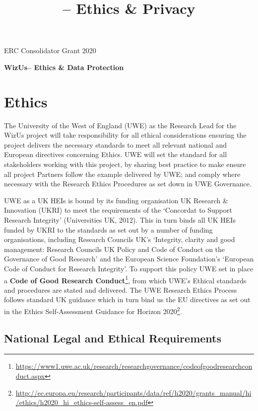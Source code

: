\documentclass[11pt,a4paper]{report}
\title{\project -- Ethics \& Privacy}
\newcommand{\project}{WizUs\xspace}
\begin{document}
\begin{center}
    ERC Consolidator Grant 2020

    \vspace{2cm}

    \textbf{\LARGE \project -- Ethics \& Data Protection}

    \vspace{2cm}

\end{center}

\section{Ethics}

The University of the West of England (UWE) as the Research Lead for the
\project project will take responsibility for all ethical considerations
ensuring the project delivers the necessary standards to meet all relevant
national and European directives concerning Ethics. UWE will set the standard
for all stakeholders working with this project, by sharing best practice to make
ensure all project Partners follow the example delivered by UWE; and comply
where necessary with the Research Ethics Procedures as set down in UWE
Governance. 

UWE as a UK HEIs is bound by its funding organisation UK Research \& Innovation
(UKRI) to meet the requirements of the `Concordat to Support Research Integrity'
(Universities UK, 2012). This in turn binds all UK HEIs funded by UKRI to the
standards as set out by a number of funding organisations, including Research
Councils UK's `Integrity, clarity and good management: Research Councils UK
Policy and Code of Conduct on the Governance of Good Research' and the European
Science Foundation's `European Code of Conduct for Research Integrity'.  To
support this policy UWE set in place a \textbf{Code of Good Research
Conduct}\footnote{\url{https://www1.uwe.ac.uk/research/researchgovernance/codeofgoodresearchconduct.aspx}}, from which
UWE's Ethical standards and procedures are stated and delivered. The UWE
Research Ethics Process follows standard UK guidance which in turn bind us the
EU directives as set out in the Ethics Self-Assessment Guidance for Horizon
2020\footnote{\url{http://ec.europa.eu/research/participants/data/ref/h2020/grants_manual/hi/ethics/h2020_hi_ethics-self-assess_en.pdf}}.

\subsection{National Legal and Ethical Requirements}
\end{document}
